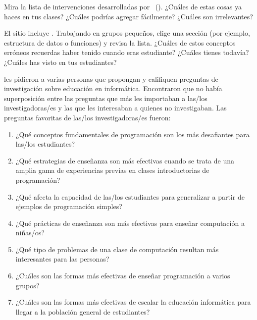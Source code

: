 
Mira la lista de intervenciones desarrolladas por~\cite{Viha2014} ().
¿Cuáles de estas cosas ya haces en tus clases?
¿Cuáles podrías agregar fácilmente?
¿Cuáles son irrelevantes?


El sitio 
incluye .
Trabajando en grupos pequeños,
elige una sección (por ejemplo, estructura de datos o funciones) y revisa la lista.
¿Cuáles de estos conceptos erróneos recuerdas haber tenido cuando eras estudiante?
¿Cuáles tienes todavía?
¿Cuáles has visto en tus estudiantes?


\cite{Denn2019} les pidieron a varias personas que propongan y califiquen preguntas de investigación sobre educación en informática.
Encontraron que no había superposición entre las preguntas que más les importaban a las/los investigadoras/es
y las que les interesaban a quienes no investigaban.
Las preguntas favoritas de las/los investigadoras/es fueron:

\begin{enumerate}

\item                              
  ¿Qué conceptos fundamentales de programación son los más desafiantes para las/los estudiantes?

\item
  ¿Qué estrategias de enseñanza son más efectivas cuando se trata de una amplia gama de experiencias previas en clases introductorias de programación?

\item
  ¿Qué afecta la capacidad de las/los estudiantes para generalizar a partir de ejemplos de programación simples?

\item
  ¿Qué prácticas de enseñanza son más efectivas para enseñar computación a niñas/os?

\item
  ¿Qué tipo de problemas de una clase de computación resultan más interesantes para las personas?    

\item
  ¿Cuáles son las formas más efectivas de enseñar programación a varios grupos?

\item
  ¿Cuáles son las formas más efectivas de escalar la educación informática para llegar a la población general de estudiantes?

\end{enumerate}

